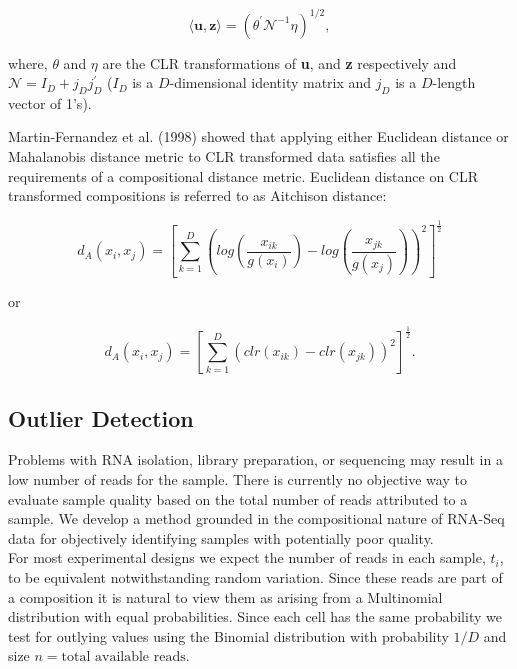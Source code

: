 \documentclass{article}\usepackage[]{graphicx}\usepackage[]{color}
\begin{document}
$$\langle \mathbf{u,z} \rangle = \left( \theta^{\prime}\mathcal{N}^{-1}\eta \right)^{1/2},$$

where, $\theta$ and $\eta$ are the CLR transformations of \textbf{u}, and \textbf{z} respectively and $\mathcal{N} = I_D + j_D^{} j_D^{\prime}$ ($I_D$ is a $D$-dimensional identity matrix and $j_D$ is a $D$-length vector of 1's).



Martin-Fernandez et al. (1998) showed that applying either Euclidean distance or Mahalanobis distance metric to CLR transformed data satisfies all the requirements of a compositional distance metric. Euclidean distance on CLR transformed compositions is referred to as Aitchison distance:

$$d_A(x_i, x_j) = \left[\sum_{k=1}^D \left( log \left(\frac{x_{ik}}{g(x_i)} \right) - log \left(\frac{x_{jk}}{g(x_j)} \right) \right)^2  \right]^\frac{1}{2}$$

or 

$$d_A(x_i, x_j) = \left[\sum_{k=1}^D \left( clr(x_{ik}) - clr(x_{jk}) \right)^2  \right]^\frac{1}{2}.$$



\subsection{Outlier Detection}
Problems with RNA isolation, library preparation, or sequencing may result in a low number of reads for the sample.  There is currently no objective way to evaluate sample quality based on the total number of reads attributed to a sample. We develop a method grounded in the compositional nature of RNA-Seq data for objectively identifying samples with potentially poor quality.\\

For most experimental designs we expect the number of reads in each sample, $t_i$, to be equivalent notwithstanding random variation.   Since these reads are part of a composition it is natural to view them as arising from a Multinomial distribution with equal probabilities. Since each cell has the same probability we test for outlying values using the Binomial distribution with probability $1/D$ and size $n = \text{total available reads}$.
\end{document}
